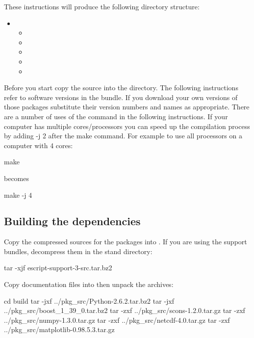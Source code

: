 These instructions will produce the following directory structure:
\begin{itemize}
 \item[]  \begin{itemize}
  \item[] 
  \item[] 
  \item[] 
  \item[] 
  \item[] 
 \end{itemize}
\end{itemize}

Before you start copy the \esfinley source into the  directory.
The following instructions refer to software versions in the  bundle.
If you download your own versions of those packages substitute their version numbers and names as appropriate.
There are a number of uses of the  command in the following instructions.
If your computer has multiple cores/processors you can speed up the compilation process by adding -j 2 after the make command.
For example to use all processors on a computer with 4 cores:
\begin{shellCode}
 make
\end{shellCode}
becomes
\begin{shellCode}
 make -j 4
\end{shellCode}


\subsection{Building the dependencies}

Copy the compressed sources for the packages into .
If you are using the support bundles, decompress them in the stand directory:
\begin{shellCode}
tar -xjf escript-support-3-src.tar.bz2
\end{shellCode}

Copy documentation files into  then unpack the archives:

\begin{shellCode}
cd build
tar -jxf ../pkg_src/Python-2.6.2.tar.bz2
tar -jxf ../pkg_src/boost_1_39_0.tar.bz2
tar -zxf ../pkg_src/scons-1.2.0.tar.gz
tar -zxf ../pkg_src/numpy-1.3.0.tar.gz
tar -zxf ../pkg_src/netcdf-4.0.tar.gz
tar -zxf ../pkg_src/matplotlib-0.98.5.3.tar.gz
\end{shellCode}


